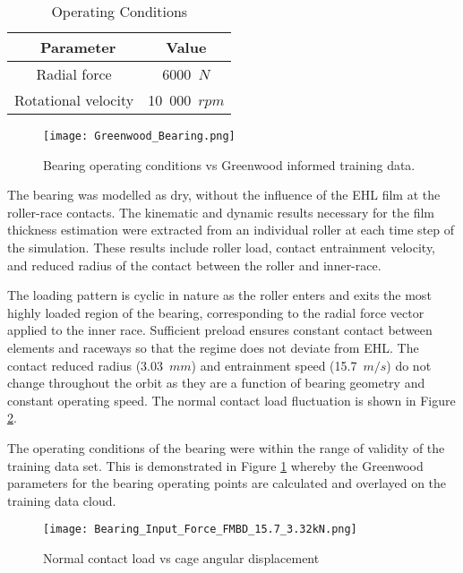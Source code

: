 \begin{table*}
	\caption{Operating Conditions}
	\label{Operating Conditions}
	\centering
	\renewcommand{\arraystretch}{1.5}%
	\begin{tabular}{|c|c|}
		\hline
		\ \textbf{Parameter} & \textbf{Value} \\ [0.5ex]
		\hline
		Radial force & 6000~$N$ \\ [0.5ex]
		\hline
		Rotational velocity & 10~000~$rpm$ \\ [0.5ex]
		\hline
	\end{tabular}
\end{table*}

\begin{figure}
	\centering  
	\texttt{[image: Greenwood\_Bearing.png]}
	\caption{Bearing operating conditions vs Greenwood informed training data.}
	\label{Greenwood_Bearing}
\end{figure} 

The bearing was modelled as dry, without the influence of the EHL film at the roller-race contacts. The kinematic and dynamic results necessary for the film thickness estimation were extracted from an individual roller at each time step of the simulation. These results include roller load, contact entrainment velocity, and reduced radius of the contact between the roller and inner-race.

The loading pattern is cyclic in nature as the roller enters and exits the most highly loaded region of the bearing, corresponding to the radial force vector applied to the inner race. Sufficient preload ensures constant contact between elements and raceways so that the regime does not deviate from EHL. The contact reduced radius (3.03~$mm$) and entrainment speed (15.7~$m/s$) do not change throughout the orbit as they are a function of bearing geometry and constant operating speed. The normal contact load fluctuation is shown in Figure \ref{Contact Normal Load ANN}.

The operating conditions of the bearing were within the range of validity of the training data set. This is demonstrated in Figure \ref{Greenwood_Bearing} whereby the Greenwood parameters for the bearing operating points are calculated and overlayed on the training data cloud.

\begin{figure}
	\centering
	\texttt{[image: Bearing\_Input\_Force\_FMBD\_15.7\_3.32kN.png]}
	\caption{Normal contact load vs cage angular displacement}
	\label{Contact Normal Load ANN}
\end{figure}

